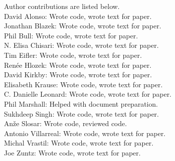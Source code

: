 Author contributions are listed below. \\
David Alonso: Wrote code, wrote text for paper. \\
Jonathan Blazek: Wrote code, wrote text for paper. \\
Phil Bull: Wrote code, wrote text for paper. \\
N. Elisa Chisari: Wrote code, wrote text for paper. \\
Tim Eifler: Wrote code, wrote text for paper. \\
Ren\'ee Hlozek: Wrote code, wrote text for paper. \\
David Kirkby: Wrote code, wrote text for paper. \\
Elisabeth Krause: Wrote code, wrote text for paper. \\
C. Danielle Leonard: Wrote code, wrote text for paper. \\
Phil Marshall: Helped with document preparation. \\
Sukhdeep Singh: Wrote code, wrote text for paper. \\
An\v{z}e Slosar: Wrote code, reviewed code. \\
Antonio Villarreal: Wrote code, wrote text for paper. \\
Michal Vrastil: Wrote code, wrote text for paper. \\
Joe Zuntz: Wrote code, wrote text for paper. \\
